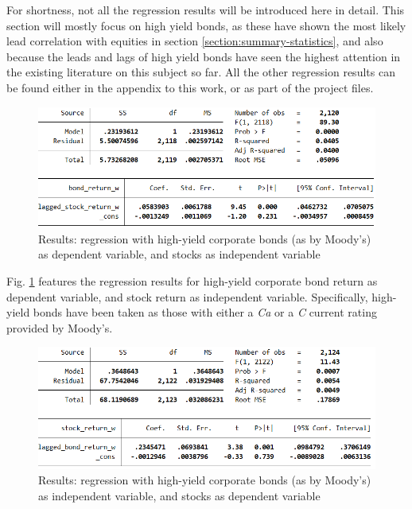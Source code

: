 For shortness, not all the regression results will be introduced here in detail. This section will mostly focus on high yield bonds, as these have shown the most likely lead correlation with equities in section \ref{section:summary-statistics}, and also because the leads and lags of high yield bonds have seen the highest attention in the existing literature on this subject so far. All the other regression results can be found either in the appendix to this work, or as part of the project files. %

\begin{figure}[h]
	\centering
	\includegraphics[trim={0 0 0 0},clip,width=1.0\linewidth]{figures/regression-results/regression-high-yield-ccc-d-moodies-bonds-as-dependent.PNG}
	\caption{Results: regression with high-yield corporate bonds (as by Moody's) as dependent variable, and stocks as independent variable}
	\label{fig:regression-high-yield-ccc-d-moodies-bonds-as-dependent.PNG}
\end{figure}

Fig. \ref{fig:regression-high-yield-ccc-d-moodies-bonds-as-dependent.PNG} features the regression results for high-yield corporate bond return as dependent variable, and stock return as independent variable. Specifically, high-yield bonds have been taken as those with either a \textit{Ca} or a \textit{C} current rating provided by Moody's. 

\begin{figure}[h]
	\centering
	\includegraphics[trim={0 0 0 0},clip,width=1.0\linewidth]{figures/regression-results/regression-high-yield-ccc-d-moodies-stocks-as-dependent.PNG}
	\caption{Results: regression with high-yield corporate bonds (as by Moody's) as independent variable, and stocks as dependent variable}
	\label{fig:regression-high-yield-ccc-d-moodies-stocks-as-dependent.PNG}
\end{figure}

